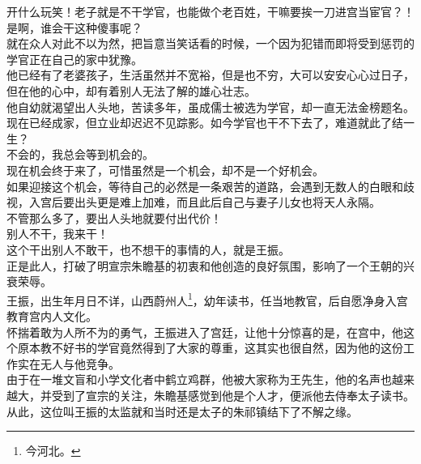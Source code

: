 \begin{multicols}{\theparacolNo}
开什么玩笑！老子就是不干学官，也能做个老百姓，干嘛要挨一刀进宫当宦官？！\\

是啊，谁会干这种傻事呢？\\

就在众人对此不以为然，把旨意当笑话看的时候，一个因为犯错而即将受到惩罚的学官正在自己的家中犹豫。\\

他已经有了老婆孩子，生活虽然并不宽裕，但是也不穷，大可以安安心心过日子，但在他的心中，却有着别人无法了解的雄心壮志。\\

他自幼就渴望出人头地，苦读多年，虽成儒士被选为学官，却一直无法金榜题名。现在已经成家，但立业却迟迟不见踪影。如今学官也干不下去了，难道就此了结一生？\\

不会的，我总会等到机会的。\\

现在机会终于来了，可惜虽然是一个机会，却不是一个好机会。\\

如果迎接这个机会，等待自己的必然是一条艰苦的道路，会遇到无数人的白眼和歧视，入宫后要出头更是难上加难，而且此后自己与妻子儿女也将天人永隔。\\

不管那么多了，要出人头地就要付出代价！\\

别人不干，我来干！\\

这个干出别人不敢干，也不想干的事情的人，就是王振。\\

正是此人，打破了明宣宗朱瞻基的初衷和他创造的良好氛围，影响了一个王朝的兴衰荣辱。\\

王振，出生年月日不详，山西蔚州人\footnote{今河北。}，幼年读书，任当地教官，后自愿净身入宫教育宫内人文化。\\

怀揣着敢为人所不为的勇气，王振进入了宫廷，让他十分惊喜的是，在宫中，他这个原本教不好书的学官竟然得到了大家的尊重，这其实也很自然，因为他的这份工作实在无人与他竞争。\\

由于在一堆文盲和小学文化者中鹤立鸡群，他被大家称为王先生，他的名声也越来越大，并受到了宣宗的关注，朱瞻基感觉到他是个人才，便派他去侍奉太子读书。\\

从此，这位叫王振的太监就和当时还是太子的朱祁镇结下了不解之缘。\\


\end{multicols}
